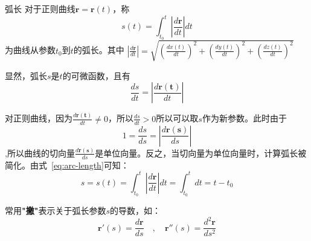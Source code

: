 \begin{mydefinition}{弧长}
	对于正则曲线$\mathbf{r}=\mathbf{r}(t)$，称
	\begin{equation}
		\label{eq:arc-length}
		s(t)=\int_{t_0}^{t}|\frac{d\mathbf{r}}{dt}|dt
	\end{equation}
	为曲线从参数$t_0$到$t$的弧长。其中
	$|\frac{d\mathbf{r}}{dt}|=\sqrt{\left(\frac{dx(t)}{dt}\right)^2+\left(\frac{dy(t)}{dt}\right)^2+\left(\frac{dz(t)}{dt}\right)^2}$
\end{mydefinition}
显然，弧长$s$是$t$的可微函数，且有$$\frac{ds}{dt}=|\frac{d\mathbf{r(t)}}{dt}|$$

对正则曲线，因为$\frac{d\mathbf{r(t)}}{dt}\neq0$，所以$\frac{ds}{dt}>0$所以可以取$s$作为新参数。此时由于$$1=\frac{ds}{ds}=|\frac{d\mathbf{r(s)}}{ds}|$$,所以曲线的切向量$\frac{d\mathbf{r(s)}}{ds}$是单位向量。反之，当切向量为单位向量时，计算弧长被简化。由式~\eqref{eq:arc-length}可知：
$$s=s(t)=\int_{t_0}^{t}|\frac{d\mathbf{r}}{dt}|dt=\int_{t_0}^{t}dt=t-t_0$$

常用\textbf{"撇"}表示关于弧长参数$s$的导数，如：$$\mathbf{r}'(s)=\frac{d\mathbf{r}}{ds}\quad ,\quad \mathbf{r}''(s)=\frac{d^2\mathbf{r}}{ds^2}$$

